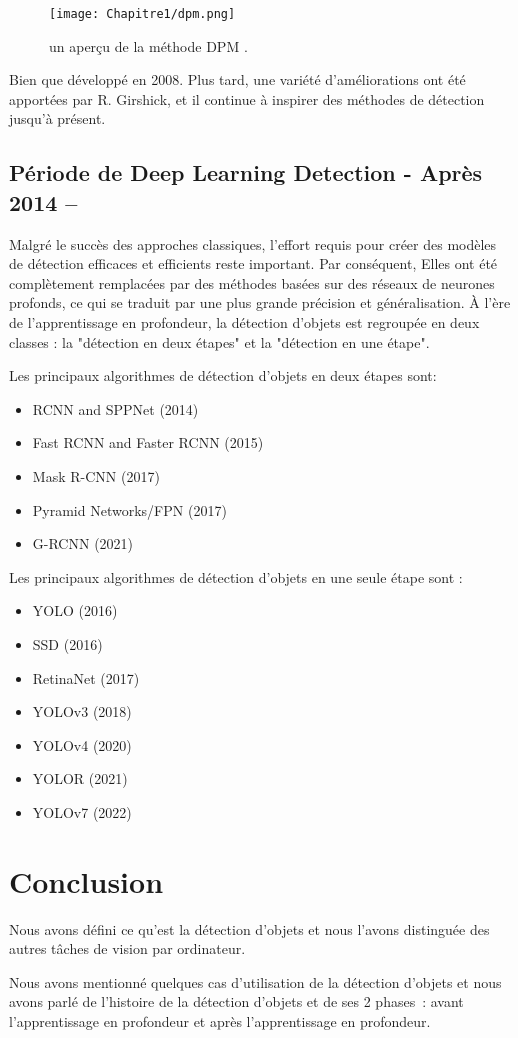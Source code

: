\begin{figure}[H]
\centering
\texttt{[image: Chapitre1/dpm.png]}
\caption{un aperçu de la méthode DPM \cite{w1}.}
\label{dpm}
\end{figure}

Bien que développé en 2008. Plus tard, une variété d'améliorations ont été apportées par R. Girshick, et il continue à inspirer des méthodes de détection jusqu'à présent.

     
\subsection{Période de Deep Learning Detection - Après 2014 –} 
Malgré le succès des approches classiques, l'effort requis pour créer des modèles de détection efficaces et efficients reste important. Par conséquent, Elles ont été complètement remplacées par des méthodes basées sur des réseaux de neurones profonds, ce qui se traduit par une plus grande précision et généralisation. À l'ère de l'apprentissage en profondeur, la détection d'objets est regroupée en deux classes : la "détection en deux étapes" et la "détection en une étape".

Les principaux algorithmes de détection d'objets en deux étapes sont:

    \begin{itemize}
    \item RCNN and SPPNet (2014)
    \item Fast RCNN and Faster RCNN (2015)
    \item Mask R-CNN (2017)
    \item Pyramid Networks/FPN (2017)
    \item G-RCNN (2021)
    \end{itemize}
    
Les principaux algorithmes de détection d'objets en une seule étape sont :

    \begin{itemize}
    \item YOLO (2016)
    \item SSD (2016)
    \item RetinaNet (2017)
    \item YOLOv3 (2018)
    \item YOLOv4 (2020)
    \item YOLOR (2021)
    \item YOLOv7 (2022)
    \end{itemize}
     

\section{Conclusion}
Nous avons défini ce qu'est la détection d'objets et nous l'avons distinguée des autres tâches de vision par ordinateur.

Nous avons mentionné quelques cas d'utilisation de la détection d'objets et nous avons parlé de l'histoire de la détection d'objets et de ses 2 phases : avant l'apprentissage en profondeur et après l'apprentissage en profondeur.

